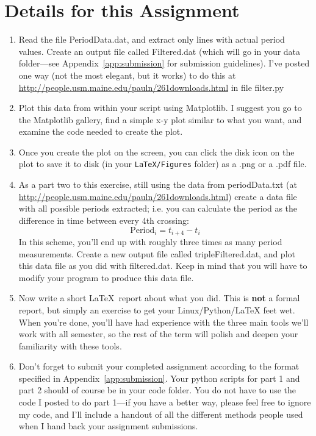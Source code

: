 \section{Details for this Assignment }\label{sec:task1}
\begin{enumerate}
	\item Read the file {\textsf PeriodData.dat}, and extract only lines with actual period values. Create an output file called {\textsf Filtered.dat} (which will go in your data folder---see Appendix~\ref{app:submission} for submission guidelines). I've posted one way (not the most elegant, but it works) to do this at \href{http://people.usm.maine.edu/pauln/261downloads.html}{http://people.usm.maine.edu/pauln/261downloads.html} in file filter.py
	\item Plot this data from within your script using Matplotlib. I suggest you go to the Matplotlib gallery, find a simple x-y plot similar to what you want, and examine the code needed to create the plot.
	\item Once you create the plot on the screen, you can click the disk icon on the plot to save it to disk (in your \verb&LaTeX/Figures& folder) as a .png or a .pdf file. 
	\item As a part two to this exercise, still using the data from periodData.txt (at \href{http://people.usm.maine.edu/pauln/261downloads.html}{http://people.usm.maine.edu/pauln/261downloads.html}) create a data file with all possible periods extracted; i.e. you can calculate the period as the difference in time between every 4th crossing:
	$$ \mathrm{Period}_i = t_{i+4} - t_i$$
In this scheme, you'll end up with roughly three times as many period measurements. Create a new output file called \textsf{tripleFiltered.dat}, and plot this data file as you did with \textsf{filtered.dat}. Keep in mind that you will have to modify your program to produce this data file. 
	\item Now write a short \LaTeX\ report about what you did. This is \textbf{not}
	a formal report, but simply an exercise to get your Linux/Python/LaTeX feet wet. When you're done, you'll have had experience with the three main tools we'll work with all semester, so the rest of the term will polish and deepen your familiarity with these tools.
	\item Don't forget to submit your completed assignment according to the format specified in Appendix~\ref{app:submission}. Your python scripts for part 1 and part 2 should of course be in your code folder. You do not have to use the code I posted to do part 1---if you have a better way, please feel free to ignore my code, and I'll include a handout of all the different methods people used when I hand back your assignment submissions. 
\end{enumerate}


